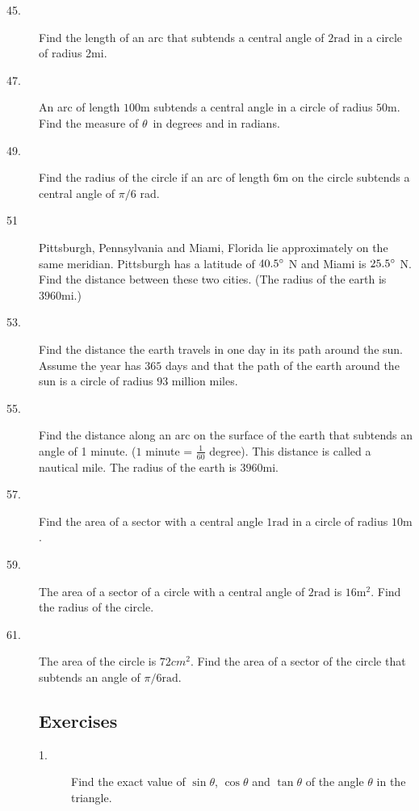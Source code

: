 \begin{description}
\item [45.]
Find the length of an arc that subtends a central angle of $2 \mbox{rad}$ in a circle of radius 2mi. 

\item [47.]
An arc of length $100 \mbox{m}$ subtends a central angle in
a circle of radius $50 \mbox{m}$. Find the measure of $\theta $\ in degrees and in radians. 

\item [49.]
Find the radius of the circle if an arc of length $6 \mbox{m}$ on the circle subtends a central angle of $\pi /6$ rad. 

\item [51] Pittsburgh, Pennsylvania
and Miami, Florida lie approximately on the same meridian. Pittsburgh has a latitude of $40.5 \mbox{{\ensuremath{{}^\circ}}}$ N and Miami is $25.5 \mbox{{\ensuremath{{}^\circ}}}$ N. Find the distance between these two cities. (The
radius of the earth is $3960 \mbox{mi}\text{.}$) 

\item [53.] Find the distance
the earth travels in one day in its path around the sun. Assume the year has $365$ days and that the path of the earth around the sun is a circle of radius $93$ million miles. 

\item [55.] Find
the distance along an arc on the surface of the earth that subtends an angle of 1 minute. ($1$ minute = $\frac{1}{60}$ degree). This distance is called a nautical mile. The
radius of the earth is $3960 \mbox{mi}\text{.}$ 

\item [57.] Find the area
of a sector with a central angle $1 \mbox{rad}$ in a circle of radius $10 \mbox{m}$. 

\item [59.]
The area of a sector of a circle with a central angle of $2 \mbox{rad}$ is $16 \mathrm{m}^{2}$. Find the radius of the circle. 

\item [61.]
The area of the circle is $72 cm^{2}$. Find the area of a sector of the circle that subtends an angle of $\pi /6 \mbox{rad}\text{.}$ \\

\subsection{Exercises}
\begin{description}
	\item [1.]  Find the exact value of $\sin  \theta $, $\cos  \theta $ and $\tan  \theta $ of the angle $\theta $ in the triangle. \\
	

\end{description}
\end{description}
